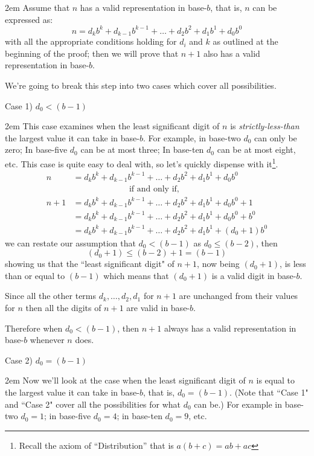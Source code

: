 \documentclass{article}
\newenvironment{jprIn}{\begin{adjustwidth}{2em}{}}{\end{adjustwidth}}
\begin{document}
\begin{jprIn}
Assume that $n$ has a valid representation in base-$b$,
that is, $n$ can be expressed as: 
\[n=d_kb^k+d_{k-1}b^{k-1}+\dots+d_2b^2+d_1b^1+d_0b^0\]
with all the appropriate conditions holding for $d_i$ and $k$ as outlined at the beginning of the proof;
then we will prove that $n+1$ also has a valid representation in base-$b$.

We're going to break this step into two cases which cover all possibilities.

\break
Case 1) $d_0<(b-1)$

\begin{jprIn}
This case examines when the least significant
digit of $n$ is \emph{strictly-less-than} the largest value it can take in base-$b$.
For example, in base-two $d_0$ can only be zero;
In base-five $d_0$ can be at most three;
In base-ten $d_0$ can be at most eight, etc.
This case is
quite easy to deal with, so let's quickly dispense with it\footnote{Recall the axiom of ``Distribution'' that is $a(b+c)=ab+ac$}.
\begin{align*}
n &= d_kb^k+d_{k-1}b^{k-1}+\dots+d_2b^2+d_1b^1+d_0b^0\\
&\;\;\;\;\;\;\;\;\;\;\;\;\;\;\;\;\;\;\;\;\;\;\;\;\text{if and only if,}\\
n+1 &= d_kb^k+d_{k-1}b^{k-1}+\dots+d_2b^2+d_1b^1+d_0b^0 + 1\\
&= d_kb^k+d_{k-1}b^{k-1}+\dots+d_2b^2+d_1b^1+d_0b^0 + b^0\\
&= d_kb^k+d_{k-1}b^{k-1}+\dots+d_2b^2+d_1b^1 + (d_0+1)b^0
\end{align*}
we can restate our assumption that $d_0<(b-1)$ as $d_0\le(b-2)$, then
\[(d_0+1)\le(b-2)+1=(b-1)\]
showing us that the ``least significant digit"
of $n+1$, now being $(d_0+1)$, is less than or equal to $(b-1)$ which means that
$(d_0+1)$ is a valid digit in base-$b$.

Since all the other terms $d_k,\dots,d_2,d_1$
for $n+1$ are unchanged from their values for
$n$ then all the digits of $n+1$ are valid in base-$b$.

Therefore when $d_0<(b-1)$, then $n+1$ always has a valid representation in base-$b$ whenever $n$ does.
\end{jprIn}
\bigskip

Case 2) $d_0=(b-1)$
\begin{jprIn}
Now we'll look at the case when the least significant digit of $n$ is equal
to the largest value it can take in base-$b$, that is,
$d_0=(b-1)$.
(Note that  ``Case 1" and ``Case 2" cover all the possibilities for what $d_0$ can be.)
For example in base-two
$d_0=1$; in base-five
$d_0=4$; in base-ten $d_0=9$, etc.


\end{jprIn}
\end{jprIn}
\end{document}
